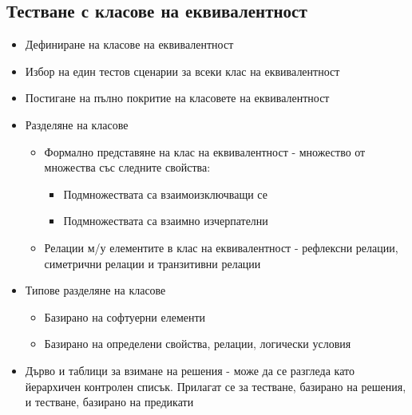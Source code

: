 \documentclass[fleqn,12pt]{article}
\begin{document}
\begin{flushleft}
\subsection{Тестване с класове на еквивалентност}
    \begin{itemize}
        \item Дефиниране на класове на еквивалентност
        \item Избор на един тестов сценарии за всеки клас на еквивалентност
        \item Постигане на пълно покритие на класовете на еквивалентност
        \item Разделяне на класове
            \begin{itemize}
                \item Формално представяне на клас на еквивалентност - множество от множества със следните свойства:
                    \begin{itemize}
                            \item Подмножествата са взаимоизключващи се
                            \item Подмножествата са взаимно изчерпателни
                        \end{itemize}
                    \item Релации м/у елементите в клас на еквивалентност - рефлексни релации, симетрични релации и транзитивни релации
                \end{itemize}
            \item Типове разделяне на класове
                \begin{itemize}
                    \item Базирано на софтуерни елементи
                    \item Базирано на определени свойства, релации, логически условия
                \end{itemize}
            \item Дърво и таблици за взимане на решения - може да се разгледа като йерархичен контролен списък. Прилагат се за тестване, базирано на решения, и тестване, базирано на предикати
        \end{itemize}


\end{flushleft}
\end{document}
